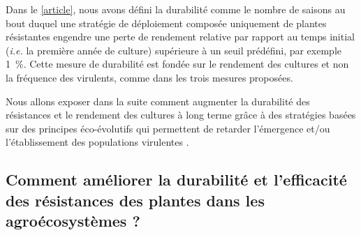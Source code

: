 
	Dans le \autoref{article}, nous avons défini la durabilité comme le nombre de saisons au bout duquel une stratégie de déploiement composée uniquement de plantes résistantes engendre une perte de rendement relative par rapport au temps initial (\textit{i.e.} la première année de culture) supérieure à un seuil prédéfini, par exemple 1~\%. Cette mesure de durabilité est fondée sur le rendement des cultures et non la fréquence des virulents, comme dans les trois mesures proposées. 	
		
	 Nous allons exposer dans la suite  comment augmenter la durabilité des résistances
et le rendement des cultures à long terme grâce à des stratégies basées sur des principes
éco-évolutifs qui permettent de retarder l’émergence et/ou l’établissement des populations
virulentes  \citep{Zhan2015, Zhan2014, Brown2015, Bourguet2016}.
	 
    
\subsection[Comment améliorer la durabilité et l'efficacité des résistances variétales ?]{Comment améliorer la durabilité et l'efficacité des résistances des plantes dans les agroécosystèmes ?}
\label{durabilite_sub}

